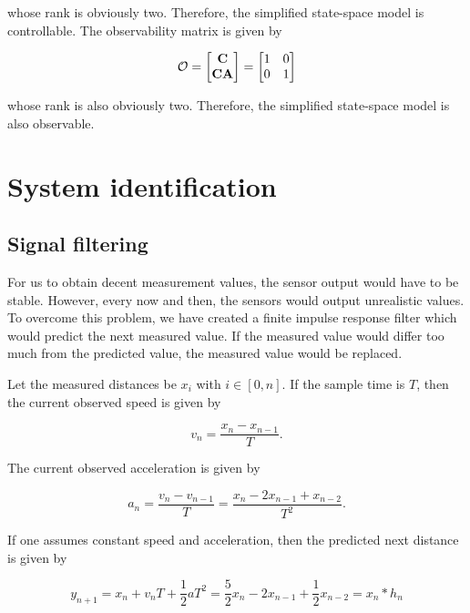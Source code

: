 \documentclass[11pt,titlepage]{report}
\begin{document}
whose rank is obviously two. Therefore, the simplified state-space model is controllable. The observability matrix is given by

\begin{equation}
	\mathcal{O} = \begin{bmatrix}
		\mathbf{C} \\
		\mathbf{C} \mathbf{A}
	\end{bmatrix} = \begin{bmatrix}
		1 & 0 \\
		0 & 1
	\end{bmatrix}
\end{equation}

whose rank is also obviously two. Therefore, the simplified state-space model is also observable.

\section{System identification}
\subsection{Signal filtering}
For us to obtain decent measurement values, the sensor output would have to be stable. However, every now and then, the sensors would output unrealistic values. To overcome this problem, we have created a finite impulse response filter which would predict the next measured value. If the measured value would differ too much from the predicted value, the measured value would be replaced.

Let the measured distances be $x_i$ with $i \in [0,n]$. If the sample time is $T$, then the current observed speed is given by

\begin{equation}
	v_n = \frac{x_{n} - x_{n-1}}{T}.
\end{equation}

The current observed acceleration is given by

\begin{equation}
	a_n = \frac{v_n - v_{n-1}}{T} = \frac{x_{n} - 2 x_{n-1} + x_{n-2}}{T^2}.
\end{equation}

If one assumes constant speed and acceleration, then the predicted next distance is given by

\begin{equation}
	y_{n+1} = x_{n} + v_n T + \frac{1}{2} a T^2 = \frac{5}{2} x_n - 2 x_{n-1} + \frac{1}{2} x_{n-2}= x_n \ast h_n
\end{equation}
\end{document}
